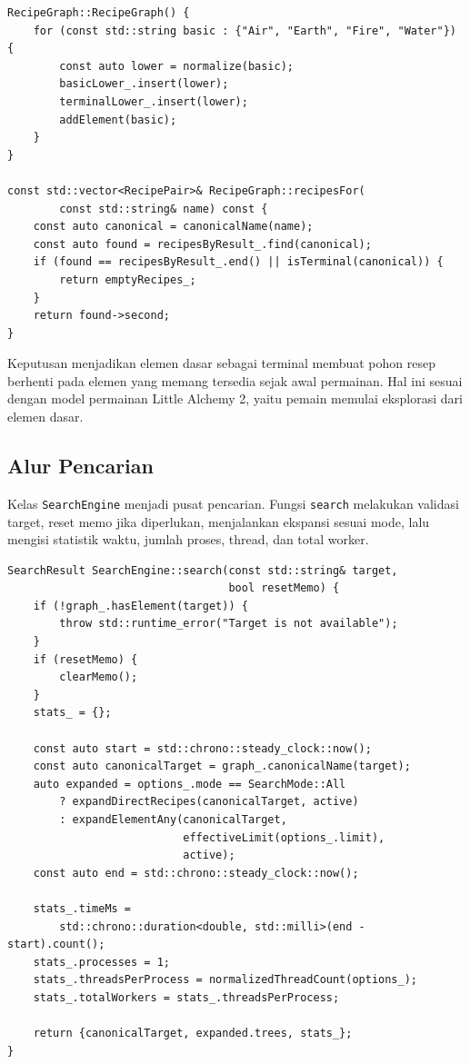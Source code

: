 \documentclass[conference]{IEEEtran}
\begin{document}
\begin{lstlisting}[style=cppstyle,caption={Inisialisasi elemen dasar pada RecipeGraph.}]
RecipeGraph::RecipeGraph() {
    for (const std::string basic : {"Air", "Earth", "Fire", "Water"}) {
        const auto lower = normalize(basic);
        basicLower_.insert(lower);
        terminalLower_.insert(lower);
        addElement(basic);
    }
}

const std::vector<RecipePair>& RecipeGraph::recipesFor(
        const std::string& name) const {
    const auto canonical = canonicalName(name);
    const auto found = recipesByResult_.find(canonical);
    if (found == recipesByResult_.end() || isTerminal(canonical)) {
        return emptyRecipes_;
    }
    return found->second;
}
\end{lstlisting}

Keputusan menjadikan elemen dasar sebagai terminal membuat pohon resep berhenti pada elemen yang memang tersedia sejak awal permainan. Hal ini sesuai dengan model permainan Little Alchemy 2, yaitu pemain memulai eksplorasi dari elemen dasar.

\subsection{Alur Pencarian}

Kelas \texttt{SearchEngine} menjadi pusat pencarian. Fungsi \texttt{search} melakukan validasi target, reset memo jika diperlukan, menjalankan ekspansi sesuai mode, lalu mengisi statistik waktu, jumlah proses, thread, dan total worker.

\begin{lstlisting}[style=cppstyle,caption={Alur utama pencarian pada SearchEngine.}]
SearchResult SearchEngine::search(const std::string& target,
                                  bool resetMemo) {
    if (!graph_.hasElement(target)) {
        throw std::runtime_error("Target is not available");
    }
    if (resetMemo) {
        clearMemo();
    }
    stats_ = {};

    const auto start = std::chrono::steady_clock::now();
    const auto canonicalTarget = graph_.canonicalName(target);
    auto expanded = options_.mode == SearchMode::All
        ? expandDirectRecipes(canonicalTarget, active)
        : expandElementAny(canonicalTarget,
                           effectiveLimit(options_.limit),
                           active);
    const auto end = std::chrono::steady_clock::now();

    stats_.timeMs =
        std::chrono::duration<double, std::milli>(end - start).count();
    stats_.processes = 1;
    stats_.threadsPerProcess = normalizedThreadCount(options_);
    stats_.totalWorkers = stats_.threadsPerProcess;

    return {canonicalTarget, expanded.trees, stats_};
}
\end{lstlisting}
\end{document}
